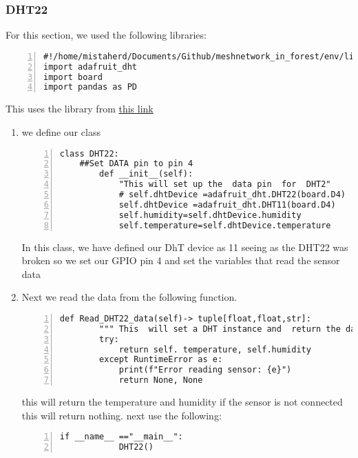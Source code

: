 \subsubsection{DHT22}
For this section, we used the following libraries:
\begin{lstlisting}[style=mystyle,numbers=left,firstnumber=1]
#!/home/mistaherd/Documents/Github/meshnetwork_in_forest/env/lib/python3.11
import adafruit_dht 
import board
import pandas as PD  
\end{lstlisting} 
This uses the library from \href{https://github.com/mrmcwethy/Adafruit_CircuitPython_DHT}{this link}
\begin{enumerate}
    \item we define our class
    \begin{lstlisting}[style=mystyle,numbers=left,firstnumber=1]
    class DHT22:
    ##Set DATA pin to pin 4
        def __init__(self):
            "This will set up the  data pin  for  DHT2"
            # self.dhtDevice =adafruit_dht.DHT22(board.D4)
            self.dhtDevice =adafruit_dht.DHT11(board.D4)
            self.humidity=self.dhtDevice.humidity
            self.temperature=self.dhtDevice.temperature
    \end{lstlisting}
    In this class, we have defined our DhT device as 11 seeing as the DHT22 was  broken
    so we set  our GPIO pin 4 and set the variables that read the  sensor data
    \item Next we read the data from the following function.
    \begin{lstlisting}[style=mystyle,numbers=left,firstnumber=1]
        def Read_DHT22_data(self)-> tuple[float,float,str]:
        """ This  will set a DHT instance and  return the data from the sensor"
        try:
            return self. temperature, self.humidity
        except RuntimeError as e:
            print(f"Error reading sensor: {e}")
            return None, None
    \end{lstlisting}
    this will  return the  temperature and humidity if the sensor is not connected
    this will return nothing. next  use the following: 
    \begin{lstlisting}[style=mystyle,numbers=left,firstnumber=1]
        if __name__ =="__main__":
            DHT22()
    \end{lstlisting}
\end{enumerate}
